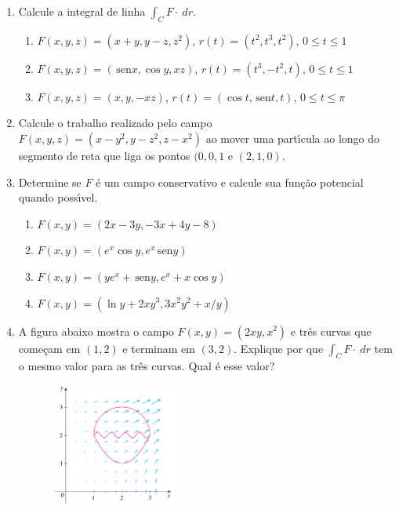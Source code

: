 \documentclass[a4paper,5pt]{amsbook}
\newcommand{\sen}{\,\mbox{sen}}
\begin{document}
\vspace{1cm}
\begin{enumerate}
    \setlength\itemsep{0.5cm}
    \item Calcule a integral de linha $\int_C F\cdot\ dr$.
        \begin{enumerate}
            \setlength\itemsep{0.3cm}
            \item $F(x,y,z) = (x+y, y-z, z^2)$, $r(t)=(t^2, t^3, t^2)$, $0\le
            t\le 1$
            \item $F(x,y,z) = (\sen{x}, \cos{y}, xz)$, $r(t)=(t^3,-t^2,t)$,
            $0\le t\le 1$
            \item $F(x,y,z) = (x, y, -xz)$, $r(t)=(\cos{t},\sen{t},t)$, $0\le
            t\le \pi$
         \end{enumerate}

    \item Calcule o trabalho realizado pelo campo $F(x,y,z) = (x-y^2, y-z^2,
    z-x^2)$ ao mover uma part\'{\i}cula ao longo do segmento de reta que liga os
    pontos $(0,0,1$ e $(2,1,0)$.

    \item Determine se $F$ \'e um campo conservativo e calcule sua fun\c{c}\~ao
    potencial quando poss\'{\i}vel.
        \begin{enumerate}
            \setlength\itemsep{0.3cm}
            \item $F(x,y) = (2x-3y, -3x+4y-8)$
            \item $F(x,y) = (e^x \cos{y}, e^x\sen{y})$
            \item $F(x,y) = (ye^x+\sen{y}, e^x+x\cos{y})$
            \item $F(x,y) = (\ln{y}+2xy^3, 3x^2y^2+x/y)$
        \end{enumerate}

    \item A figura abaixo mostra o campo $F(x,y) = (2xy,x^2)$ e tr\^es curvas que
    come\c{c}am em $(1,2)$ e terminam em $(3,2)$. Explique por que $\int_C F\cdot\
    dr$ tem o mesmo valor para as tr\^es curvas. Qual \'e esse valor?
    \begin{figure}[h]
        \centering
        \includegraphics[width=0.4\textwidth]{lista-12-fig1.png}
    \end{figure}


\end{enumerate}
\end{document}
